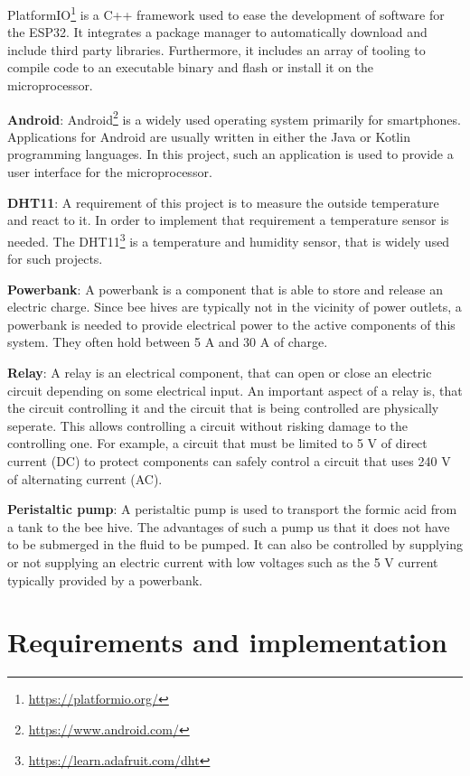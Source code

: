 \documentclass[11pt]{article}
\begin{document}
    PlatformIO\footnote{\url{https://platformio.org/}} is a C++ framework used to ease the development of software for the ESP32.
    It integrates a package manager to automatically download and include third party libraries.
    Furthermore, it includes an array of tooling to compile code to an executable binary and flash or install it on the microprocessor.

    \textbf{Android}: Android\footnote{\url{https://www.android.com/}} is a widely used operating system primarily for smartphones.
    Applications for Android are usually written in either the Java or Kotlin programming languages.
    In this project, such an application is used to provide a user interface for the microprocessor.
    
    \textbf{DHT11}: A requirement of this project is to measure the outside temperature and react to it.
    In order to implement that requirement a temperature sensor is needed.
    The DHT11\footnote{\url{https://learn.adafruit.com/dht}} is a temperature and humidity sensor, that is widely used for such projects.

    \textbf{Powerbank}: A powerbank is a component that is able to store and release an electric charge.
    Since bee hives are typically not in the vicinity of power outlets, a powerbank is needed to provide electrical power to the active components of this system.
    They often hold between 5 A and 30 A of charge.

    \textbf{Relay}: A relay is an electrical component, that can open or close an electric circuit depending on some electrical input.
    An important aspect of a relay is, that the circuit controlling it and the circuit that is being controlled are physically seperate.
    This allows controlling a circuit without risking damage to the controlling one.
    For example, a circuit that must be limited to 5 V of direct current (DC) to protect components can safely control a circuit that uses 240 V of alternating current (AC).

    \textbf{Peristaltic pump}: A peristaltic pump is used to transport the formic acid from a tank to the bee hive.
    The advantages of such a pump us that it does not have to be submerged in the fluid to be pumped.
    It can also be controlled by supplying or not supplying an electric current with low voltages such as the 5 V current typically provided by a powerbank.

    \section{Requirements and implementation}\label{sec:requirements-and-implementation}

    \newpage
    \printbibliography
\end{document}

